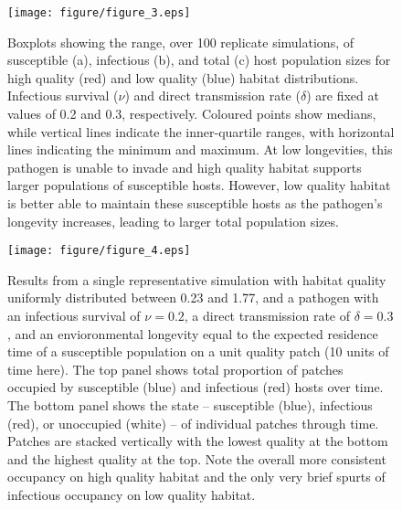 \documentclass{article}
\begin{document}
\begin{figure}
\texttt{[image: figure/figure\_3.eps]}
\centering
\caption{Boxplots showing the range, over 100 replicate simulations, of susceptible (a), infectious (b), and total (c) host population sizes for high quality (red) and low quality (blue) habitat distributions.  Infectious survival ($\nu$) and direct transmission rate ($\delta$) are fixed at values of 0.2 and 0.3, respectively.  Coloured points show medians, while vertical lines indicate the inner-quartile ranges, with horizontal lines indicating the minimum and maximum.  At low longevities, this pathogen is unable to invade and high quality habitat supports larger populations of susceptible hosts.  However, low quality habitat is better able to maintain these susceptible hosts as the pathogen's longevity increases, leading to larger total population sizes.}
\label{popsizes}
\end{figure}

\begin{figure}
\texttt{[image: figure/figure\_4.eps]}
\centering
\caption{Results from a single representative simulation with habitat quality uniformly distributed between 0.23 and 1.77, and a pathogen with an infectious survival of $\nu = 0.2$, a direct transmission rate of $\delta = 0.3$, and an envioronmental longevity equal to the expected residence time of a susceptible population on a unit quality patch (10 units of time here).  The top panel shows total proportion of patches occupied by susceptible (blue) and infectious (red) hosts over time.  The bottom panel shows the state -- susceptible (blue), infectious (red), or unoccupied (white) -- of individual patches through time.  Patches are stacked vertically with the lowest quality at the bottom and the highest quality at the top.  Note the overall more consistent occupancy on high quality habitat and the only very brief spurts of infectious occupancy on low quality habitat.}
\label{simvis}
\end{figure}

\clearpage
\end{document}
